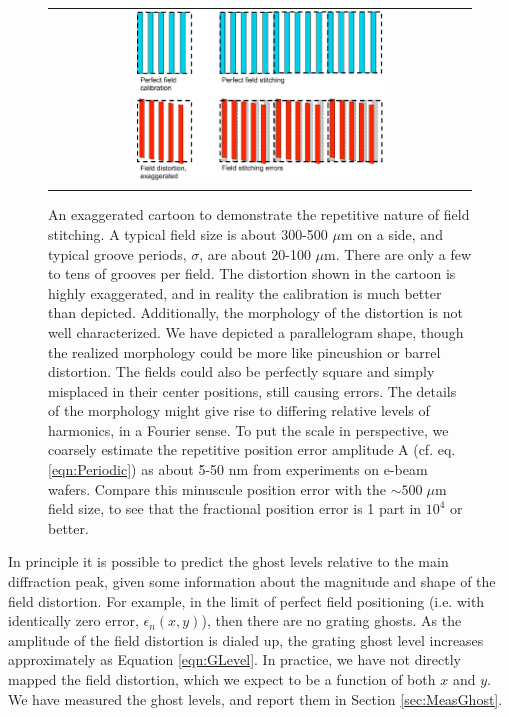 \documentclass[]{spie}  %
\begin{document}
\begin{figure}
\begin{center}
 \begin{tabular}{c}
    \includegraphics[width=0.6\textwidth]{figs/Field_stitching_errors.pdf}
   \end{tabular}
  \end{center}
  \caption[Field Stitching Error Cartoon]{\label{fig:FieldCartoon} An exaggerated cartoon to demonstrate the repetitive nature of field stitching.  A typical field size is about 300-500 $\mu$m on a side, and typical groove periods, $\sigma$, are about 20-100 $\mu$m.  There are only a few to tens of grooves per field.  The distortion shown in the cartoon is highly exaggerated, and in reality the calibration is much better than depicted.  Additionally, the morphology of the distortion is not well characterized.  We have depicted a parallelogram shape, though the realized morphology could be more like pincushion or barrel distortion.  The fields could also be perfectly square and simply misplaced in their center positions, still causing errors.  The details of the morphology might give rise to differing relative levels of harmonics, in a Fourier sense.  To put the scale in perspective, we coarsely estimate the repetitive position error amplitude A (cf. eq. \ref{eqn:Periodic}) as about 5-50 nm from experiments on e-beam wafers.  Compare this minuscule position error with the $\sim500 \; \mu$m field size, to see that the fractional position error is 1 part in $10^4$ or better.}
\end{figure}

In principle it is possible to predict the ghost levels relative to the main diffraction peak, given some information about the magnitude and shape of the field distortion.  For example, in the limit of perfect field positioning (i.e. with identically zero error, $\epsilon_n(x,y)$), then there are no grating ghosts.  As the amplitude of the field distortion is dialed up, the grating ghost level increases approximately as Equation \ref{eqn:GLevel}.  In practice, we have not directly mapped the field distortion, which we expect to be a function of both $x $ and $y$.  We have measured the ghost levels, and report them in Section \ref{sec:MeasGhost}.
\end{document}
